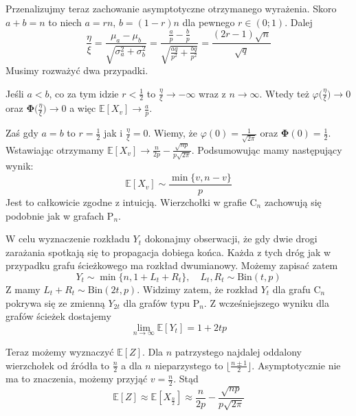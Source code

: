Przenalizujmy teraz zachowanie asymptotyczne otrzymanego wyrażenia. Skoro $a+b=n$ to niech $a=rn$, $b=(1-r)n$ dla pewnego $r\in(0;1)$. Dalej 
\[
    \frac{\eta}{\xi}=\frac{\mu_a-\mu_b}{\sqrt{\sigma_a^2+\sigma_b^2}}=\frac{\frac{a}{p}-\frac{b}{p}}{\sqrt{\frac{aq}{p^2}+\frac{bq}{p^2}}}=\frac{(2r-1)\sqrt{n}}{\sqrt{q}}
\]
Musimy rozważyć dwa przypadki.

Jeśli $a<b$, co za tym idzie $r<\frac{1}{2}$ to $\frac{\eta}{\xi}\to -\infty$ wraz z $n\to \infty$. Wtedy też $\varphi\Big(\frac{\eta}{\xi}\Big)\to 0$ oraz $\mathbf{\Phi}\Big(\frac{\eta}{\xi}\Big)\to 0$ a więc $\mathbb{E}[X_v] \to \frac{a}{p}$. 

Zaś gdy $a=b$ to $r=\frac{1}{2}$ jak i  $\frac{\eta}{\xi}=0$. Wiemy, że $\varphi(0)=\frac{1}{\sqrt{2\pi}}$ oraz $\mathbf{\Phi}(0)=\frac{1}{2}$. Wstawiając otrzymamy $\mathbb{E}[X_v] \to \frac{n}{2p}-\frac{\sqrt{np}}{p\sqrt{2\pi}}$. 
Podsumowując mamy następujący wynik:
\[
    \mathbb{E}[X_v] \sim \frac{\min\{v,n-v\}}{p}
\]
Jest to całkowicie zgodne z intuicją. Wierzchołki w grafie $\mathrm{C}_n$ zachowują się podobnie jak w grafach $\mathrm{P}_n$.

W celu wyznaczenie rozkładu $Y_t$ dokonajmy obserwacji, że gdy dwie drogi zarażania spotkają się to propagacja dobiega końca. Każda z tych dróg jak w przypadku grafu ścieżkowego ma rozkład dwumianowy. Możemy zapisać zatem
\[
    Y_t \sim \min\{n, 1+ L_t + R_t\}, \quad L_t,R_t\sim \mathrm{Bin}(t,p)
\] 
Z  mamy $L_t+R_t\sim\mathrm{Bin}(2t,p)$. Widzimy zatem, że rozkład $Y_t$ dla grafu $\mathrm{C}_n$ pokrywa się ze zmienną $Y_{2t}$ dla grafów typu $\mathrm{P}_n$. Z wcześniejszego wyniku dla grafów ścieżek dostajemy
\[
    \lim_{n\to\infty} \mathbb{E}[Y_t] = 1+2tp
\]

Teraz możemy wyznaczyć $\mathbb{E}[Z]$. Dla $n$ patrzystego najdalej oddalony wierzchołek od źródła to $\frac{n}{2}$ a dla $n$ nieparzystego to $\lfloor \frac{n\pm 1}{2}\rfloor$. Asymptotycznie nie ma to znaczenia, możemy przyjąć $v=\frac{n}{2}$. Stąd
\[
    \mathbb{E}[Z] \approx \mathbb{E}[X_{\frac{n}{2}}] \approx \frac{n}{2p}-\frac{\sqrt{np}}{p\sqrt{2\pi}}
\]

